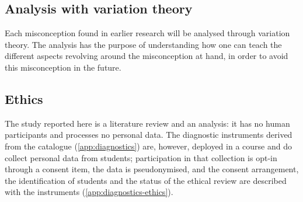 \subsection{Analysis with variation theory}
\label{sec:method-vt-analysis}

Each misconception found in earlier research will be analysed through
variation theory. The analysis has the purpose of understanding how one can
teach the different aspects revolving around the misconception at hand, in
order to avoid this misconception in the future.

\subsection{Ethics}
\label{sec:method-ethics}

The study reported here is a literature review and an analysis: it has no
human participants and processes no personal data.
The diagnostic instruments derived from the catalogue
(\cref{app:diagnostics}) are, however, deployed in a course and do collect
personal data from students; participation in that collection is opt-in
through a consent item, the data is pseudonymised, and the consent
arrangement, the identification of students and the status of the ethical
review are described with the instruments
(\cref{app:diagnostics-ethics}).
